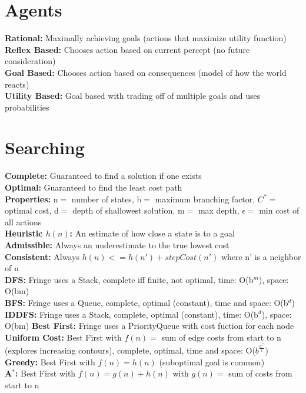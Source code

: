 \documentclass[11pt, a4paper]{article}
\begin{document}
    \begin{multicols*}{1}
        \section{Agents}
            \textbf{Rational:} Maximally achieving goals (actions that maximize utility function) \\
            \textbf{Reflex Based:} Chooses action based on current percept (no future consideration)\\
            \textbf{Goal Based:} Chooses action based on consequences (model of how the world reacts)\\
            \textbf{Utility Based:} Goal based with trading off of multiple goals and uses probabilities \\

        \section{Searching}
            \textbf{Complete:} Guaranteed to find a solution if one exists\\
            \textbf{Optimal:} Guaranteed to find the least cost path\\
            \textbf{Properties:} n$ =$ number of states, b$ =$ maximum branching factor, $C^*$$ =$ optimal cost, d$ =$ depth of shallowest solution, m$ =$ max depth, $\epsilon =$ min cost of all actions\\
            \textbf{Heuristic $h(n)$:} An estimate of how close a state is to a goal\\
            \textbf{Admissible:} Always an underestimate to the true lowest cost\\
            \textbf{Consistent:} Always $h(n) <= h(n') + stepCost(n')$ where n' is a neighbor of n\\
            \textbf{DFS:} Fringe uses a Stack, complete iff finite, not optimal, time: O(b$^{m}$), space: O(bm)\\
            \textbf{BFS:} Fringe uses a Queue, complete, optimal (constant), time and space: O(b$^{d}$)\\
            \textbf{IDDFS:} Fringe uses a Stack, complete, optimal (constant), time: O(b$^{d}$), space: O(bm)
            \textbf{Best First:} Fringe uses a PriorityQueue with cost fuction for each node\\
            \textbf{Uniform Cost:} Best First with $f(n)=$ sum of edge costs from  start to n (explores increasing contours), complete, optimal, time and space: O($b^{\frac{C^*}{\epsilon}}$)\\
            \textbf{Greedy:} Best First with $f(n)= h(n)$ (suboptimal goal is common)\\
            \textbf{A$^*$:} Best First with $f(n)= g(n) + h(n)$ with $g(n)=$ sum of costs from start to n\\
    \end{multicols*}
\end{document}
